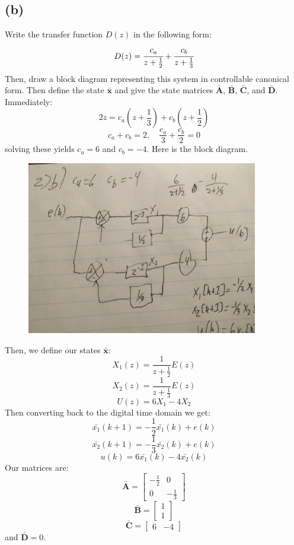 \documentclass{article}
\begin{document}
\subsection*{(b)}
Write the transfer function $D(z)$ in the following form:
\[D(z)=\cfrac{c_a}{z+\frac{1}{2}}+\cfrac{c_b}{z+\frac{1}{3}}\]
Then, draw a block diagram representing this system in controllable canonical form. Then define the state $\bar{\boldsymbol{x}}$ and give the state matrices $\bar{\boldsymbol{A}}$, $\bar{\boldsymbol{B}}$, $\bar{\boldsymbol{C}}$, and $\bar{\boldsymbol{D}}$.\\
Immediately:
\[2z=c_a(z+\frac{1}{3})+c_b(z+\frac{1}{2})\]
\[c_a+c_b=2,\quad \frac{c_a}{3}+\frac{c_b}{2}=0\]
solving these yields $c_a=6$ and $c_b=-4$. Here is the block diagram.
\begin{figure}[H]
    \centering
    \includegraphics[width=0.9\textwidth]{PR2.jpg}
\end{figure}
Then, we define our states $\bar{\boldsymbol{x}}$:
\[X_1(z)=\frac{1}{z+\frac{1}{2}}E(z)\]
\[X_2(z)=\frac{1}{z+\frac{1}{3}}E(z)\]
\[U(z)=6X_1-4X_2\]
Then converting back to the digital time domain we get:
\[\bar{x_1}(k+1)=-\frac{1}{2}\bar{x_1}(k)+e(k)\]
\[\bar{x_2}(k+1)=-\frac{1}{3}\bar{x_2}(k)+e(k)\]
\[u(k)=6\bar{x_1}(k)-4\bar{x_2}(k)\]
Our matrices are:
\[\bar{\boldsymbol{A}}=\begin{bmatrix}-\frac{1}{2}&0\\0&-\frac{1}{3}\end{bmatrix}\]
\[\bar{\boldsymbol{B}}=\begin{bmatrix}1\\1\end{bmatrix}\]
\[\bar{\boldsymbol{C}}=\begin{bmatrix}6&-4\end{bmatrix}\]
and $\bar{\boldsymbol{D}}=0$.
\end{document}
